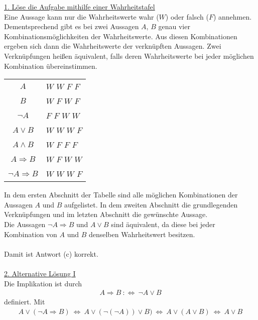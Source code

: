 \underline{1. Löse die Aufgabe mithilfe einer Wahrheitstafel}\\
Eine Aussage kann nur die Wahrheitswerte wahr ($ W $) oder falsch ($ F $) annehmen.
Dementsprechend gibt es bei zwei Aussagen $ A $, $ B $ genau vier Kombinationsmöglichkeiten der Wahrheitswerte.
Aus diesen Kombinationen ergeben sich dann die Wahrheitswerte der verknüpften Aussagen.
Zwei Verknüpfungen heißen äquivalent, falls deren Wahrheitswerte bei jeder möglichen Kombination übereinstimmen.
\begin{center}
	\begin{tabular}{cllll}
		\hline
		\multicolumn{1}{c|}{$A$} & \multicolumn{4}{l}{$W$ $W$ $F$ $F$} \\
		\multicolumn{1}{c|}{$B$} & \multicolumn{4}{l}{$W$ $F$ $W$ $F$} \\ \hline
		\multicolumn{1}{c|}{$\neg A$} & \multicolumn{4}{l}{$F$ $F$ $W$ $W$} \\ 
		\multicolumn{1}{c|}{$A \vee B$} & \multicolumn{4}{l}{$W$ $W$ $W$ $F$}  \\ 
		\multicolumn{1}{c|}{$A \wedge B$} & \multicolumn{4}{l}{$W$ $F$ $F$ $F$}  \\ 
		\multicolumn{1}{c|}{$A \Rightarrow B$} & \multicolumn{4}{l}{$W$ $F$ $W$ $W$}  \\
		\hline
		
		\multicolumn{1}{c|}{$\neg A \Rightarrow B$} & \multicolumn{4}{l}{$W$ $W$ $W$ $F$}  \\ 
	
		\hline
	\end{tabular}
\end{center}
In dem ersten Abschnitt der Tabelle sind alle möglichen Kombinationen der Aussagen $ A $ und $ B $ aufgelistet.
In dem zweiten Abschnitt die grundlegenden Verknüpfungen und 
im letzten Abschnitt die gewünschte Aussage.\\
Die Aussagen $ \neg A \Rightarrow B  $ und $ A \vee B  $ sind äquivalent, da diese bei jeder Kombination von $ A $ und $ B $ denselben Wahrheitswert besitzen.
\\
\\
Damit ist Antwort (c) korrekt.
\\
\\
\newpage
\underline{2. Alternative Lösung I}\\
Die Implikation ist durch
\begin{align*}
A \Rightarrow B \ : \Leftrightarrow \ \neg A \vee B
\end{align*}
definiert.
Mit 
\begin{align*}
A \vee (\neg A \Rightarrow B) 
\ \Leftrightarrow \
A \vee ( \neg (\neg A)) \vee B )
\ \Leftrightarrow \
A \vee (A \vee B)
\ \Leftrightarrow \
A \vee B
\end{align*}
